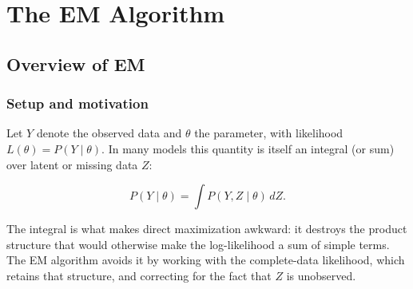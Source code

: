 \documentclass[
  letterpaper,
  DIV=11,
  numbers=noendperiod]{scrreprt}
\begin{document}

\chapter{The EM Algorithm}\label{the-em-algorithm}

\section{Overview of EM}\label{overview-of-em}

\subsection{Setup and motivation}\label{setup-and-motivation}

Let \(Y\) denote the observed data and \(\theta\) the parameter, with
likelihood \(L(\theta) = P(Y \mid \theta)\). In many models this
quantity is itself an integral (or sum) over latent or missing data
\(Z\):

\[
P(Y \mid \theta) = \int P(Y, Z \mid \theta) \, dZ .
\]

The integral is what makes direct maximization awkward: it destroys the
product structure that would otherwise make the log-likelihood a sum of
simple terms. The EM algorithm avoids it by working with the
complete-data likelihood, which retains that structure, and correcting
for the fact that \(Z\) is unobserved.
\end{document}
